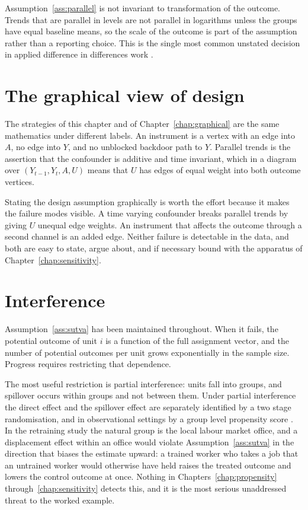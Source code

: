 Assumption~\ref{ass:parallel} is not invariant to transformation of the outcome.
Trends that are parallel in levels are not parallel in logarithms unless the
groups have equal baseline means, so the scale of the outcome is part of the
assumption rather than a reporting choice. This is the single most common
unstated decision in applied difference in differences work
\citep{delacroix2021didscale}.

\section{The graphical view of design}
\label{sec:design-dag-view}

The strategies of this chapter and of Chapter~\ref{chap:graphical} are the same
mathematics under different labels. An instrument is a vertex with an edge into
$A$, no edge into $Y$, and no unblocked backdoor path to $Y$. Parallel trends is
the assertion that the confounder is additive and time invariant, which in a
diagram over $(Y_{t-1}, Y_t, A, U)$ means that $U$ has edges of equal weight
into both outcome vertices.

Stating the design assumption graphically is worth the effort because it makes
the failure modes visible. A time varying confounder breaks parallel trends by
giving $U$ unequal edge weights. An instrument that affects the outcome through
a second channel is an added edge. Neither failure is detectable in the data,
and both are easy to state, argue about, and if necessary bound with the
apparatus of Chapter~\ref{chap:sensitivity}.

\section{Interference}
\label{sec:design-interference}

Assumption~\ref{ass:sutva} has been maintained throughout. When it fails, the
potential outcome of unit $i$ is a function of the full assignment vector, and
the number of potential outcomes per unit grows exponentially in the sample
size. Progress requires restricting that dependence.

The most useful restriction is partial interference: units fall into groups, and
spillover occurs within groups and not between them. Under partial interference
the direct effect and the spillover effect are separately identified by a
two stage randomisation, and in observational settings by a group level
propensity score \citep{halloran2017interference}. In the retraining study the natural group is the local labour
market office, and a displacement effect within an office would violate
Assumption~\ref{ass:sutva} in the direction that biases the estimate upward: a
trained worker who takes a job that an untrained worker would otherwise have
held raises the treated outcome and lowers the control outcome at once. Nothing
in Chapters~\ref{chap:propensity} through~\ref{chap:sensitivity} detects this,
and it is the most serious unaddressed threat to the worked example.
